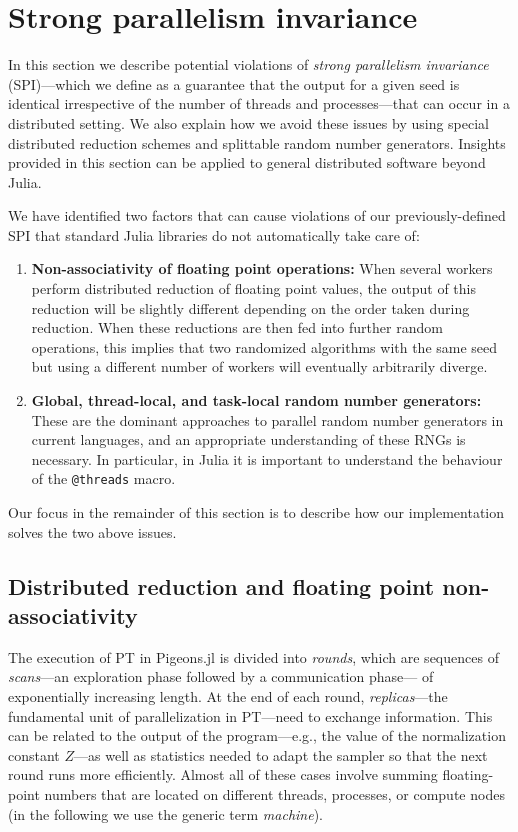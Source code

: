 \section{Strong parallelism invariance}\label{sec:PI_causes}

In this section we describe potential violations of \emph{strong 
parallelism invariance} (SPI)---which we define as a guarantee that the output 
for a given seed is identical irrespective of the number of threads and 
processes---that can occur in a distributed setting. We also explain how we 
avoid these issues by using special distributed reduction schemes and 
splittable random number generators. Insights provided in this section 
can be applied to general distributed software beyond Julia.

 
We have identified two factors that can cause violations of our previously-defined 
SPI that standard Julia libraries 
do not automatically take care of:
\begin{enumerate}   
  \item \textbf{Non-associativity of floating point operations:} When 
  several workers perform distributed reduction of floating point values, 
  the output of this reduction will be slightly different depending on the order taken 
  during reduction. 
  When these reductions are then fed into further random operations, 
  this implies that two randomized algorithms with the same seed but using a 
  different number of workers will eventually arbitrarily diverge.

  \item \textbf{Global, thread-local, and task-local random number generators:} 
  These are the dominant approaches to parallel random number generators in current languages, 
  and an appropriate understanding of these RNGs is necessary. In particular, 
  in Julia it is important to understand the behaviour of the \texttt{@threads} macro.
\end{enumerate}
Our focus in the remainder of this section is to describe how our implementation 
solves the two above issues.


\subsection{Distributed reduction and floating point non-associativity}
The execution of PT in Pigeons.jl is divided into \emph{rounds}, which are
sequences of \emph{scans}---an exploration phase followed by a communication phase---%
of exponentially increasing length. At the end of each round,
\emph{replicas}---the fundamental unit of parallelization in PT---need to exchange information. This can be related to the output of the 
program---e.g., the value of the normalization constant $Z$---as well as statistics 
needed to adapt the sampler so that the next round runs more efficiently.
Almost all of these cases involve summing floating-point numbers that are 
located on different threads, processes, or compute nodes (in the following we use 
the generic term \emph{machine}).


